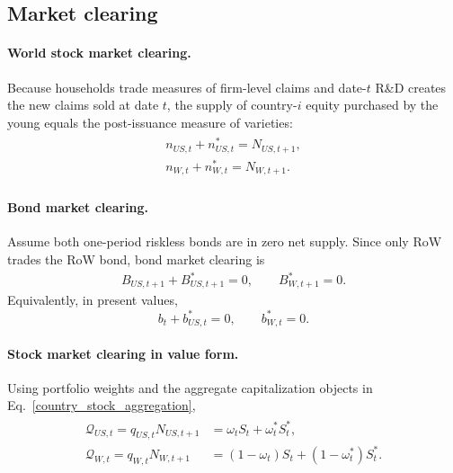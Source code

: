 \documentclass{article}
\begin{document}
\subsection{Market clearing}

\paragraph{World stock market clearing.}
Because households trade measures of firm-level claims and date-$t$ R\&D creates the new claims sold at date $t$, the supply of country-$i$ equity purchased by the young equals the post-issuance measure of varieties:
\begin{align}\label{stock_clear_mod}
\begin{split}
n_{US,t}+n^*_{US,t}=N_{US,t+1},\\
n_{W,t}+n^*_{W,t}=N_{W,t+1}.
\end{split}
\end{align}

\paragraph{Bond market clearing.}
Assume both one-period riskless bonds are in zero net supply. Since only RoW trades the RoW bond, bond market clearing is
\begin{align}\label{bond_clear_mod_zerosupply}
B_{US,t+1}+B^*_{US,t+1}=0,
\qquad
B^*_{W,t+1}=0.
\end{align}
Equivalently, in present values,
\[
b_t+b_{US,t}^*=0,
\qquad
b_{W,t}^*=0.
\]

\paragraph{Stock market clearing in value form.}
Using portfolio weights and the aggregate capitalization objects in Eq.~\eqref{country_stock_aggregation},
\begin{align}\label{stock_weight_clear_mod}
\begin{split}
\mathcal Q_{US,t}=q_{US,t}N_{US,t+1} &= \omega_t S_t+\omega_t^*S_t^*,\\
\mathcal Q_{W,t}=q_{W,t}N_{W,t+1}  &= (1-\omega_t)S_t+(1-\omega_t^*)S_t^*.
\end{split}
\end{align}
\end{document}
